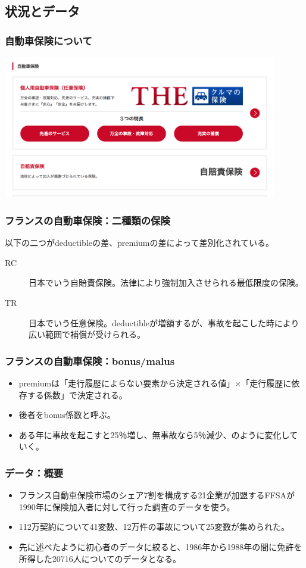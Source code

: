 \documentclass[dvipdfmx, 12pt]{beamer}
\begin{document}
\subsection{状況とデータ}
\begin{frame}\frametitle{自動車保険について}
\centering
        \includegraphics[width = 12cm]{ins.png}
\end{frame}

\begin{frame}\frametitle{フランスの自動車保険：二種類の保険}
以下の二つがdeductibleの差、premiumの差によって差別化されている。

	\begin{description}
	\item[RC] 日本でいう自賠責保険。法律により強制加入させられる最低限度の保険。
	\item[TR] 日本でいう任意保険。deductibleが増額するが、事故を起こした時により広い範囲で補償が受けられる。
	\end{description}
\end{frame}

\begin{frame}\frametitle{フランスの自動車保険：bonus/malus}
	\begin{itemize}
	\item premiumは「走行履歴によらない要素から決定される値」×「走行履歴に依存する係数」で決定される。
	\item 後者をbonus係数と呼ぶ。
	\item ある年に事故を起こすと25％増し、無事故なら5％減少、のように変化していく。
	\end{itemize}
\end{frame}

\begin{frame}\frametitle{データ：概要}
	\begin{itemize}
	\item フランス自動車保険市場のシェア7割を構成する21企業が加盟するFFSAが1990年に保険加入者に対して行った調査のデータを使う。
	\item 112万契約について41変数、12万件の事故について25変数が集められた。
	\item 先に述べたように初心者のデータに絞ると、1986年から1988年の間に免許を所得した20716人についてのデータとなる。
	\end{itemize}
\end{frame}
\end{document}
